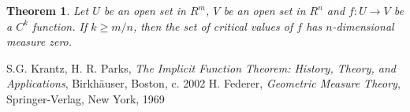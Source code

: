 \documentclass[12pt]{article}
\newtheorem*{thm}{Theorem}
\begin{document}
\begin{thm} Let $U$ be an open set in $R^m$,  $V$ be an open set in $R^n$ and
$f: U \to V$ be a $C^k$ function. If $k \geq m/n$,  then the set of
critical values of $f$ has $n$-dimensional measure zero.
\end{thm}


\begin{thebibliography}{99}
 S.G. Krantz, H. R. Parks, \emph{The Implicit Function Theorem: 
History, Theory, and Applications}, Birkh\"auser, Boston, c. 2002
 H. Federer, \emph{Geometric Measure Theory}, Springer-Verlag,
New York, 1969
\end{thebibliography}

\end{document}
